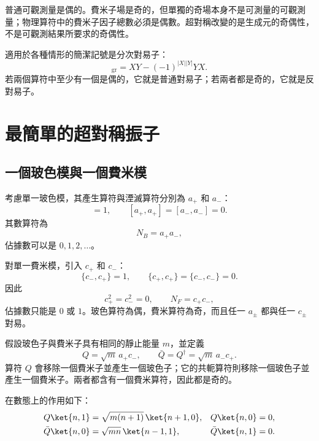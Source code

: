 普通可觀測量是偶的。費米子場是奇的，但單獨的奇場本身不是可測量的可觀測量；物理算符中的費米子因子總數必須是偶數。超對稱改變的是生成元的奇偶性，不是可觀測結果所要求的奇偶性。

適用於各種情形的簡潔記號是分次對易子：
\begin{equation}
[X,Y]_{\mathrm{gr}}
=XY-(-1)^{|X||Y|}YX.
\end{equation}
若兩個算符中至少有一個是偶的，它就是普通對易子；若兩者都是奇的，它就是反對易子。

\section{最簡單的超對稱振子}

\subsection{一個玻色模與一個費米模}

考慮單一玻色模，其產生算符與湮滅算符分別為 \(a_+\) 和 \(a_-\)：
\begin{equation}
[a_-,a_+]=1,
\qquad
[a_+,a_+]=[a_-,a_-]=0.
\end{equation}
其數算符為
\begin{equation}
N_B=a_+a_-,
\end{equation}
佔據數可以是 \(0,1,2,\ldots\)。

對單一費米模，引入 \(c_+\) 和 \(c_-\)：
\begin{equation}
\{c_-,c_+\}=1,
\qquad
\{c_+,c_+\}=\{c_-,c_-\}=0.
\end{equation}
因此
\begin{equation}
c_+^2=c_-^2=0,
\qquad
N_F=c_+c_-,
\end{equation}
佔據數只能是 \(0\) 或 \(1\)。玻色算符為偶，費米算符為奇，而且任一 \(a_\pm\) 都與任一 \(c_\pm\) 對易。


假設玻色子與費米子具有相同的靜止能量 \(m\)，並定義
\begin{equation}
Q=\sqrt m\,a_+c_-,
\qquad
\bar Q=Q^\dagger=\sqrt m\,a_-c_+.
\end{equation}
算符 \(Q\) 會移除一個費米子並產生一個玻色子；它的共軛算符則移除一個玻色子並產生一個費米子。兩者都含有一個費米算符，因此都是奇的。

在數態上的作用如下：
\begin{align}
Q\ket{n,1}
&=\sqrt{m(n+1)}\,\ket{n+1,0},
&
Q\ket{n,0}&=0,\\
\bar Q\ket{n,0}
&=\sqrt{mn}\,\ket{n-1,1},
&
\bar Q\ket{n,1}&=0.
\end{align}

